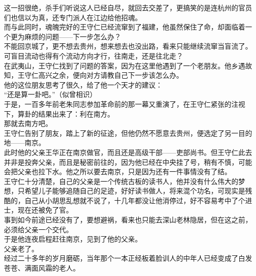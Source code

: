 \begin{multicols}{\theparacolNo}
这一招很绝，杀手们听说这人已经自尽，就回去交差了，更搞笑的是连杭州的官员们也信以为真，还专门派人在江边给他招魂。\\

而与此同时，魂魄完好的王守仁已经流窜到了福建，他虽然保住了命，却面临着一个更为麻烦的问题——下一步怎么办？\\

不能回京城了，更不想去贵州，想来想去也没出路，看来只能继续流窜当盲流了。\\

可盲目流动也得有个流动方向才行，往南走，还是往北走？\\

在武夷山，王守仁找到了问题的答案，因为在这里他遇到了一个老朋友。他乡遇故知，王守仁高兴之余，便向对方请教自己下一步该怎么办。\\

他的这位朋友思考了很久，给了他一个天才的建议：\\

“还是算一卦吧。”（似曾相识）\\

于是，一百多年前老朱同志参加革命前的那一幕又重演了，在王守仁紧张的注视下，算卦的结果出来了：利在南方。\\

那就去南方吧。\\

王守仁告别了朋友，踏上了新的征途，但他仍然不愿意去贵州，便选定了另一目的地——南京。\\

此时他的父亲王华正在南京做官，而且还是高级干部——吏部尚书。但王守仁此去并非是投奔父亲，而且是秘密前往的，因为他已经在中央挂了号，稍有不慎，可能会把父亲也拉下水。他之所以要去南京，只是因为还有一件事情没有了结。\\

王守仁十分清楚，自己的父亲是一个传统古板的读书人，他并没有什么伟大的梦想，只希望儿子能够追随自己的足迹，好好读书做人，将来混个功名，可现实是残酷的，自己从小胡思乱想就不说了，十几年都没让他消停过，好不容易考中了个进士，现在还被免了官。\\

事到如今前途已经没有了，要想避祸，看来也只能去深山老林隐居，但在这之前，必须给父亲一个交代。\\

于是他连夜启程赶往南京，见到了他的父亲。\\

父亲老了。\\

经过二十多年的岁月磨砺，当年那个一本正经板着脸训人的中年人已经变成了白发苍苍、满面风霜的老人。\\


\end{multicols}
